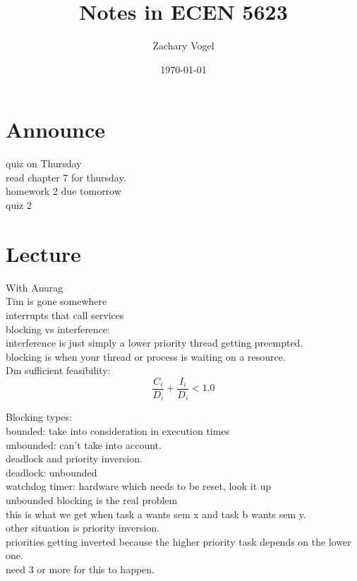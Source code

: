 \documentclass{article}
\author{Zachary Vogel}
\date{\today}
\title{Notes in ECEN 5623}
\begin{document}
\maketitle


\section*{Announce}
quiz on Thursday\\
read chapter 7 for thursday.\\
homework 2 due tomorrow\\
quiz 2\\

\section*{Lecture}
With Anurag\\
Tim is gone somewhere\\

interrupts that call services\\
blocking vs interference:\\
interference is just simply a lower priority thread getting preempted.\\
blocking is when your thread or process is waiting on a resource.\\

Dm sufficient feasibility:
\[\frac{C_i}{D_i}+\frac{I_i}{D_i}<1.0\]

Blocking types:\\
bounded: take into consideration in execution times\\
unbounded: can't take into account.\\


deadlock and priority inversion.\\

deadlock: unbounded\\

watchdog timer: hardware which needs to be reset, look it up\\

unbounded blocking is the real problem\\

this is what we get when task a wants sem x and task b wants sem y.\\



other situation is priority inversion.\\
priorities getting inverted because the higher priority task depends on the lower one.\\
need 3 or more for this to happen.\\
\end{document}
